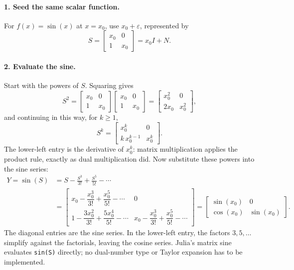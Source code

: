 \documentclass[11pt]{article}
\begin{document}
\paragraph{1. Seed the same scalar function.}
For $f(x)=\sin(x)$ at $x=x_0$, use $x_0+\varepsilon$, represented by
\[
 S=\begin{bmatrix}x_0&0\\1&x_0\end{bmatrix}=x_0I+N.
\]

\paragraph{2. Evaluate the sine.}
Start with the powers of $S$. Squaring gives
\[
 S^2=\begin{bmatrix}x_0&0\\1&x_0\end{bmatrix}
     \begin{bmatrix}x_0&0\\1&x_0\end{bmatrix}
    =\begin{bmatrix}x_0^2&0\\2x_0&x_0^2\end{bmatrix},
\]
and continuing in this way, for $k\geq1$,
\[
 S^k=\begin{bmatrix}x_0^k&0\\k\,x_0^{k-1}&x_0^k\end{bmatrix}.
\]
The lower-left entry is the derivative of $x_0^k$: matrix multiplication
applies the product rule, exactly as dual multiplication did. Now substitute
these powers into the sine series:
\begin{align*}
 Y=\sin(S)
 &=S-\frac{S^3}{3!}+\frac{S^5}{5!}-\cdots\\
 &=\begin{bmatrix}
 x_0-\dfrac{x_0^3}{3!}+\dfrac{x_0^5}{5!}-\cdots & 0\\[8pt]
 1-\dfrac{3x_0^2}{3!}+\dfrac{5x_0^4}{5!}-\cdots &
 x_0-\dfrac{x_0^3}{3!}+\dfrac{x_0^5}{5!}-\cdots
 \end{bmatrix}
 =\begin{bmatrix}\sin(x_0)&0\\\cos(x_0)&\sin(x_0)\end{bmatrix}.
\end{align*}
The diagonal entries are the sine series. In the lower-left entry, the factors
$3,5,\ldots$ simplify against the factorials, leaving the cosine series.
Julia's matrix sine evaluates \texttt{sin(S)} directly; no dual-number type or
Taylor expansion has to be implemented.
\end{document}
